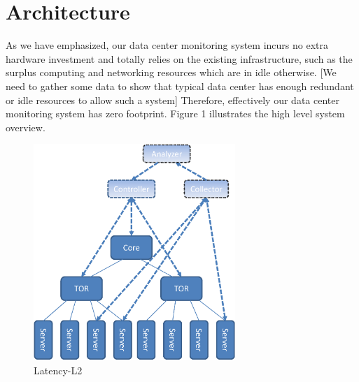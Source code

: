 \documentclass{acm_proc_article-sp}
\begin{document}
\section{Architecture}
As we have emphasized, our data center monitoring system incurs no extra hardware investment and totally relies on the existing infrastructure, such as the surplus computing and networking resources which are in idle otherwise. [We need to gather some data to show that typical data center has enough redundant or idle resources to allow such a system] Therefore, effectively our data center monitoring system has zero footprint. Figure 1 illustrates the high level system overview.\\
\begin{figure}[htbp]
\includegraphics[width=3in]{image/arch}
\caption{Latency-L2}\label{fig:architecture}
\end{figure}
\end{document}
